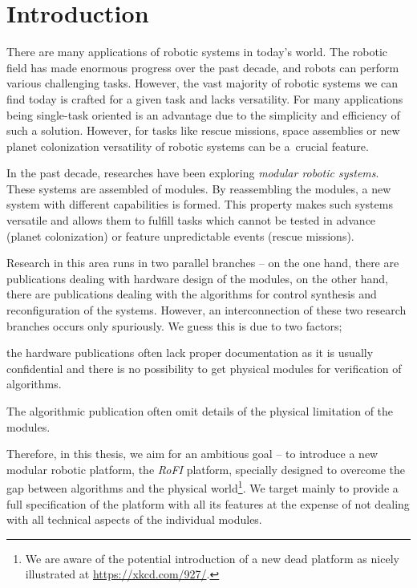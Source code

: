 \chapter{Introduction}\label{chap:introduction}

There are many applications of robotic systems in today's world. The robotic
field has made enormous progress over the past decade, and robots can perform
various challenging tasks. However, the vast majority of robotic systems we can
find today is crafted for a given task and lacks versatility. For many
applications being single-task oriented is an advantage due to the simplicity
and efficiency of such a solution. However, for tasks like rescue missions,
space assemblies or new planet colonization versatility of robotic systems can
be a~crucial feature.

In the past decade, researches have been exploring \emph{modular robotic
systems}. These systems are assembled of modules. By reassembling the modules, a
new system with different capabilities is formed. This property makes such
systems versatile and allows them to fulfill tasks which cannot be tested in
advance (planet colonization) or feature unpredictable events (rescue missions).

Research in this area runs in two parallel branches -- on the one hand, there
are publications dealing with hardware design of the modules, on the other hand,
there are publications dealing with the algorithms for control synthesis and
reconfiguration of the systems. However, an interconnection of these two
research branches occurs only spuriously. We guess this is due to two factors;
\begin{enumerate*}
    \item the hardware publications often lack proper documentation as it is
    usually confidential and there is no possibility to get physical modules for
    verification of algorithms.
    \item The algorithmic publication often omit details of the physical
    limitation of the modules.
\end{enumerate*}

Therefore, in this thesis, we aim for an ambitious goal -- to introduce a new
modular robotic platform, the \emph{RoFI} platform, specially designed to
overcome the gap between algorithms and the physical world\footnote{We are aware
of the potential introduction of a new dead platform as nicely illustrated at
\url{https://xkcd.com/927/}.}. We target mainly to provide a full specification
of the platform with all its features at the expense of not dealing with all
technical aspects of the individual modules.

